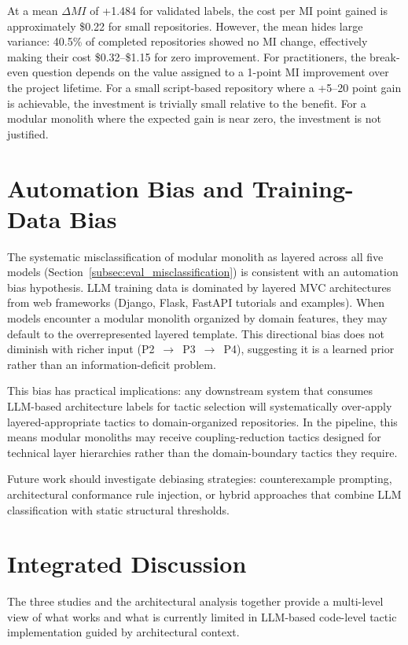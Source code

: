 At a mean $\Delta MI$ of +1.484 for validated labels, the cost per MI point gained is approximately \$0.22 for small repositories. However, the mean hides large variance: 40.5\% of completed repositories showed no MI change, effectively making their cost \$0.32--\$1.15 for zero improvement. For practitioners, the break-even question depends on the value assigned to a 1-point MI improvement over the project lifetime. For a small script-based repository where a +5--20 point gain is achievable, the investment is trivially small relative to the benefit. For a modular monolith where the expected gain is near zero, the investment is not justified.

\section{Automation Bias and Training-Data Bias}
\label{sec:eval_bias}

The systematic misclassification of modular monolith as layered across all five models (Section~\ref{subsec:eval_misclassification}) is consistent with an automation bias hypothesis. LLM training data is dominated by layered MVC architectures from web frameworks (Django, Flask, FastAPI tutorials and examples). When models encounter a modular monolith organized by domain features, they may default to the overrepresented layered template. This directional bias does not diminish with richer input (P2~$\to$~P3~$\to$~P4), suggesting it is a learned prior rather than an information-deficit problem.

This bias has practical implications: any downstream system that consumes LLM-based architecture labels for tactic selection will systematically over-apply layered-appropriate tactics to domain-organized repositories. In the pipeline, this means modular monoliths may receive coupling-reduction tactics designed for technical layer hierarchies rather than the domain-boundary tactics they require.

Future work should investigate debiasing strategies: counterexample prompting, architectural conformance rule injection, or hybrid approaches that combine LLM classification with static structural thresholds.

\section{Integrated Discussion}
\label{sec:eval_discussion}

The three studies and the architectural analysis together provide a multi-level view of what works and what is currently limited in LLM-based code-level tactic implementation guided by architectural context.

